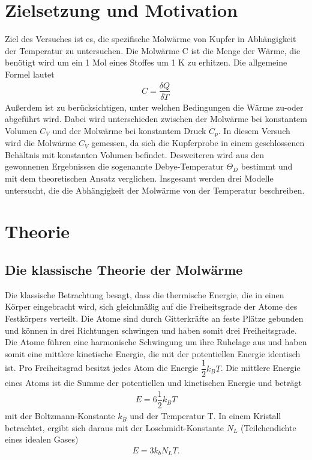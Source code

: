\section{Zielsetzung und Motivation}
Ziel des Versuches ist es, die spezifische Molwärme von Kupfer in Abhängigkeit der Temperatur zu untersuchen. Die Molwärme C ist die Menge der Wärme, die benötigt wird um ein 1 Mol eines Stoffes um 1 K zu erhitzen. Die  allgemeine Formel  lautet 
\begin{align}
C=\dfrac{\delta Q}{\delta T}
\end{align} 
Außerdem ist zu berücksichtigen, unter welchen Bedingungen die Wärme zu-oder abgeführt wird. Dabei wird unterschieden zwischen der Molwärme bei konstantem Volumen $C_V$ und der Molwärme bei konstantem Druck $C_p$. In diesem Versuch wird die Molwärme $C_V$ gemessen, da sich die Kupferprobe in einem geschlossenen Behältnis mit konstanten Volumen befindet. Desweiteren wird aus den gewonnenen Ergebnissen die sogenannte Debye-Temperatur  $\Theta_D$ bestimmt und mit dem theoretischen Ansatz verglichen. Insgesamt werden drei Modelle untersucht, die die Abhängigkeit der Molwärme von der Temperatur beschreiben. 

\section{Theorie} 
\subsection{Die klassische Theorie der Molwärme}
Die klassische Betrachtung besagt, dass die thermische Energie, die in einen Körper eingebracht wird, sich gleichmäßig auf die Freiheitsgrade der Atome des Festkörpers verteilt. Die Atome sind durch Gitterkräfte an feste Plätze gebunden und können in drei Richtungen schwingen und haben somit drei Freiheitsgrade. Die Atome führen eine harmonische Schwingung um ihre Ruhelage aus und haben somit eine mittlere kinetische Energie, die mit der potentiellen Energie identisch ist. Pro Freiheitsgrad besitzt jedes Atom die Energie $\dfrac{1}{2}k_BT$. Die mittlere Energie eines Atoms ist die Summe der potentiellen und kinetischen Energie und beträgt
\begin{align}
E=6\dfrac{1}{2}k_BT
\end{align}
mit der Boltzmann-Konstante $k_B$  und der Temperatur T. In einem Kristall betrachtet, ergibt sich daraus mit der Loschmidt-Konstante $N_L$ (Teilchendichte eines idealen Gases)
\begin{align}
E=3k_bN_LT.
\end{align}

